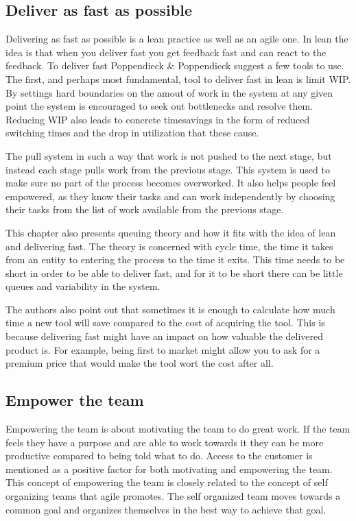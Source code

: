 \subsection{Deliver as fast as possible}

Delivering as fast as possible is a lean practice as well as an agile one. In lean the idea is that when you deliver fast you get feedback fast and can react to the feedback. To deliver fast Poppendieck \& Poppendieck suggest a few tools to use. The first, and perhaps most fundamental, tool to deliver fast in lean is limit WIP. By settings hard boundaries on the amout of work in the system at any given point the system is encouraged to seek out bottlenecks and resolve them. Reducing WIP also leads to concrete timesavings in the form of reduced switching times and the drop in utilization that these cause.\cite{poppendieck2003lean}

The pull system in such a way that work is not pushed to the next stage, but instead each stage pulls work from the previous stage. This system is used to make sure no part of the process becomes overworked. It also helps people feel empowered, as they know their tasks and can work independently by choosing their tasks from the list of work available from the previous stage.\cite{poppendieck2003lean}

This chapter also presents queuing theory and how it fits with the idea of lean and delivering fast. The theory is concerned with cycle time, the time it takes from an entity to entering the process to the time it exits. This time needs to be short in order to be able to deliver fast, and for it to be short there can be little queues and variability in the system.\cite{poppendieck2003lean}

The authors also point out that sometimes it is enough to calculate how much time a new tool will save compared to the cost of acquiring the tool. This is because delivering fast might have an impact on how valuable the delivered product is.\cite{poppendieck2003lean} For example, being first to market might allow you to ask for a premium price that would make the tool wort the cost after all.

\subsection{Empower the team}

Empowering the team is about motivating the team to do great work. If the team feels they have a purpose and are able to work towards it they can be more productive compared to being told what to do. Access to the customer is mentioned as a positive factor for both motivating and empowering the team.\cite{poppendieck2003lean} This concept of empowering the team is closely related to the concept of self organizing teams that agile promotes. The self organized team moves towards a common goal and organizes themselves in the best way to achieve that goal. 

